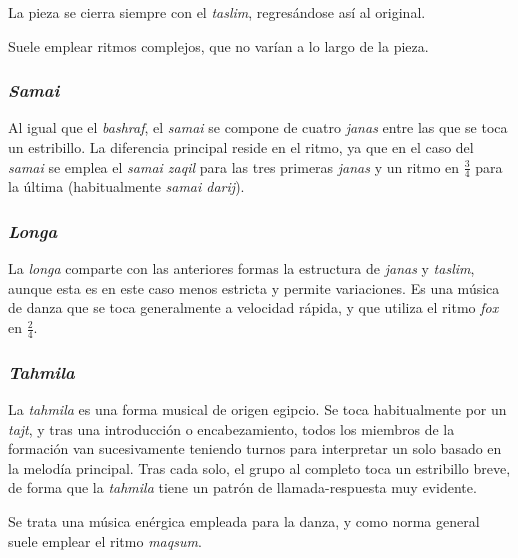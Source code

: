         La pieza se cierra siempre con el \emph{taslim}, regresándose así al \maqam original.

        Suele emplear ritmos complejos, que no varían a lo largo de la pieza.


    \subsubsection{\emph{Samai}}

        Al igual que el \emph{bashraf}, el \emph{samai} se compone de cuatro \emph{janas} entre las que se toca un estribillo. La diferencia principal reside en el ritmo, ya que en el caso del \emph{samai} se emplea el \emph{samai zaqil} para las tres primeras \emph{janas} y un ritmo en $\frac{3}{4}$ para la última (habitualmente \emph{samai darij}).


    \subsubsection{\emph{Longa}}

        La \emph{longa} comparte con las anteriores formas la estructura de \emph{janas} y \emph{taslim}, aunque esta es en este caso menos estricta y permite variaciones. Es una música de danza que se toca generalmente a velocidad rápida, y que utiliza el ritmo \emph{fox} en $\frac{2}{4}$.


    \subsubsection{\emph{Tahmila}}

        La \emph{tahmila} es una forma musical de origen egipcio. Se toca habitualmente por un \emph{tajt}, y tras una introducción o encabezamiento, todos los miembros de la formación van sucesivamente teniendo turnos para interpretar un solo basado en la melodía principal. Tras cada solo, el grupo al completo toca un estribillo breve, de forma que la \emph{tahmila} tiene un patrón de llamada-respuesta muy evidente.

        Se trata una música enérgica empleada para la danza, y como norma general suele emplear el ritmo \emph{maqsum}.


